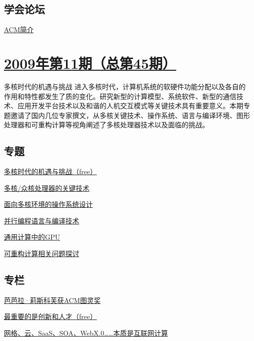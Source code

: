 \documentclass[a4paper]{article}
\begin{document}
\subsection{学会论坛}
\href{http://history.ccf.org.cn/resources/1190201776262/2010/04/15/046086.pdf}{ACM简介}


\section{\href{http://history.ccf.org.cn/sites/ccf/jsjtbbd.jsp?contentId=2542567629052}{\textbf{2009年第11期（总第45期）}}}
多核时代的机遇与挑战 进入多核时代，计算机系统的软硬件功能分配以及各自的作用和特性都发生了质的变化。研究新型的计算模型、系统软件、新型的通信技术、应用开发平台技术以及和谐的人机交互模式等关键技术具有重要意义。本期专题邀请了国内几位专家撰文，从多核关键技术、操作系统、语言与编译环境、图形处理器和可重构计算等视角阐述了多核处理器技术以及面临的挑战。
\subsection{专题}
\href{http://history.ccf.org.cn/resources/1190201776262/2010/04/15/045010.pdf}{多核时代的机遇与挑战（free）}

\href{http://history.ccf.org.cn/resources/1190201776262/2010/04/15/045012.pdf}{多核/众核处理器的关键技术}

\href{http://history.ccf.org.cn/resources/1190201776262/2010/04/15/045019.pdf}{面向多核环境的操作系统设计}

\href{http://history.ccf.org.cn/resources/1190201776262/2010/04/15/045028.pdf}{并行编程语言与编译技术}

\href{http://history.ccf.org.cn/resources/1190201776262/2010/04/15/045043.pdf}{通用计算中的GPU}

\href{http://history.ccf.org.cn/resources/1190201776262/2010/04/15/045034.pdf}{可重构计算相关问题探讨}

\subsection{专栏}
\href{http://history.ccf.org.cn/resources/1190201776262/2010/04/15/045050.pdf}{芭芭拉·莉斯科芙获ACM图灵奖}

\href{http://history.ccf.org.cn/resources/1190201776262/2010/04/15/045052.pdf}{最重要的是创新和人才（free）}

\href{http://history.ccf.org.cn/resources/1190201776262/2010/04/15/045055.pdf}{网格、云、SaaS、SOA、WebX.0……本质是互联网计算}
\end{document}

